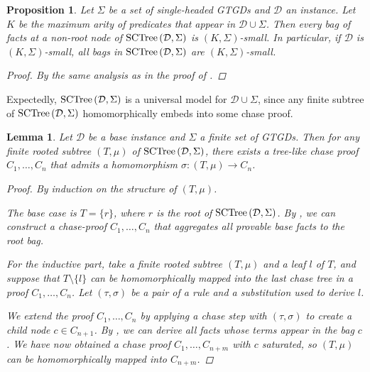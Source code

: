 \documentclass[12pt]{report}
\theoremstyle{plain}
\newtheorem{proposition}[theorem]{Proposition}
\newtheorem{lemma}[theorem]{Lemma}
\theoremstyle{definition}
\newcommand{\SCTree}[2]{\ensuremath{\normalfont{\textrm{SCTree}} \left( #1, #2 \right)}}
\begin{document}
\begin{proposition}
  Let $\Sigma$ be a set of single-headed GTGDs and $\mathcal{D}$ an instance. Let $K$ be the maximum arity of predicates that appear in $\mathcal{D} \cup \Sigma$. Then every bag of facts at a non-root node of \emph{$\SCTree{\mathcal{D}}{\Sigma}$} is $(K, \Sigma)$-small. In particular, if $\mathcal{D}$ is $(K, \Sigma)$-small, all bags in $\SCTree{\mathcal{D}}{\Sigma}$ are $(K, \Sigma)$-small.
  \begin{proof}
    By the same analysis as in the proof of .
  \end{proof}
\end{proposition}

Expectedly, $\SCTree{\mathcal{D}}{\Sigma}$ is a universal model for $\mathcal{D} \cup \Sigma$, since any finite subtree of $\SCTree{\mathcal{D}}{\Sigma}$ homomorphically embeds into some chase proof.

\begin{lemma}
\label{sctree-subtree-embeds-into-a-chase-proof}
  Let $\mathcal{D}$ be a base instance and $\Sigma$ a finite set of GTGDs. Then for any finite rooted subtree $(T, \mu)$ of $\SCTree{\mathcal{D}}{\Sigma}$, there exists a tree-like chase proof $C_1, \ldots, C_n$ that admits a homomorphism $\sigma: (T, \mu) \rightarrow C_n$.
  \begin{proof}
    By induction on the structure of $(T, \mu)$.

    The base case is $T = \{r\}$, where $r$ is the root of $\SCTree{\mathcal{D}}{\Sigma}$. By , we can construct a chase-proof $C_1, \ldots, C_n$ that aggregates all provable base facts to the root bag.

    For the inductive part, take a finite rooted subtree $(T, \mu)$ and a leaf $l$ of $T$, and suppose that $T \setminus \{l\}$ can be homomorphically mapped into the last chase tree in a proof $C_1, \ldots, C_n$. Let $(\tau, \sigma)$ be a pair of a rule and a substitution used to derive $l$.
    
    We extend the proof $C_1, \ldots, C_n$ by applying a chase step with $(\tau, \sigma)$ to create a child node $c \in C_{n+1}$. By , we can derive all facts whose terms appear in the bag $c$. We have now obtained a chase proof $C_1, \ldots, C_{n+m}$ with $c$ saturated, so $(T, \mu)$ can be homomorphically mapped into $C_{n+m}$.
  \end{proof}
\end{lemma}
\end{document}
